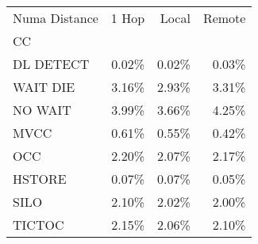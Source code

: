 \begin{tabular}{lrrr}
\toprule
Numa Distance &  1 Hop &  Local &  Remote \\
CC        &        &        &         \\
\midrule
DL DETECT &  0.02\% &  0.02\% &   0.03\% \\
WAIT DIE  &  3.16\% &  2.93\% &   3.31\% \\
NO WAIT   &  3.99\% &  3.66\% &   4.25\% \\
MVCC      &  0.61\% &  0.55\% &   0.42\% \\
OCC       &  2.20\% &  2.07\% &   2.17\% \\
HSTORE    &  0.07\% &  0.07\% &   0.05\% \\
SILO      &  2.10\% &  2.02\% &   2.00\% \\
TICTOC    &  2.15\% &  2.06\% &   2.10\% \\
\bottomrule
\end{tabular}
